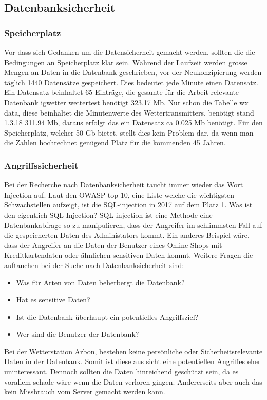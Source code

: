 \subsection{Datenbanksicherheit}
\subsubsection{Speicherplatz}
Vor dass sich Gedanken um die Datensicherheit gemacht werden, sollten die die Bedingungen an Speicherplatz klar sein. Während der Laufzeit werden grosse Mengen an Daten in die Datenbank geschrieben, vor der Neukonzipierung werden täglich 1440 Datensätze gespeichert. Dies bedeutet jede Minute einen Datensatz. Ein Datensatz beinhaltet 65 Einträge, die gesamte für die Arbeit relevante Datenbank igwetter wettertest benötigt 323.17  Mb. Nur schon die Tabelle wx data, diese beinhaltet die Minutenwerte des Wettertransmitters, benötigt stand 1.3.18 311.94 Mb, daraus erfolgt das ein Datensatz ca 0.025 Mb benötigt. Für den Speicherplatz, welcher 50 Gb bietet, stellt dies kein Problem dar, da wenn man die Zahlen hochrechnet genügend Platz für die kommenden 45 Jahren.\\


\subsubsection{Angriffssicherheit}
Bei der Recherche nach Datenbanksicherheit taucht immer wieder das Wort Injection auf. Laut den OWASP top 10, eine Liste welche die wichtigsten Schwachstellen aufzeigt, ist die SQL-injection in 2017 auf dem Platz 1. Was ist den eigentlich SQL Injection? SQL injection ist eine Methode eine Datenbankabfrage so zu manipulieren, dass der Angreifer im schlimmsten Fall auf die gespeicherten Daten des Administators kommt. Ein anderes Beispiel wäre, dass der Angreifer an die Daten der Benutzer eines Online-Shops mit Kreditkartendaten oder ähnlichen sensitiven Daten kommt.
Weitere Fragen die auftauchen bei der Suche nach Datenbanksicherheit sind:
\begin{itemize}
\item Was für Arten von Daten beherbergt die Datenbank?
\item Hat es sensitive Daten?
\item Ist die Datenbank überhaupt ein potentielles Angriffsziel?
\item Wer sind die Benutzer der Datenbank?
\end{itemize}

Bei der Wetterstation Arbon, bestehen keine persönliche oder Sicherheitsrelevante Daten in der Datenbank. Somit ist diese aus sicht eine potentiellen Angriffes eher uninteressant. Dennoch sollten die Daten hinreichend geschützt sein, da es vorallem schade wäre wenn die Daten verloren gingen. Andererseits aber auch das kein Missbrauch vom Server gemacht werden kann.

